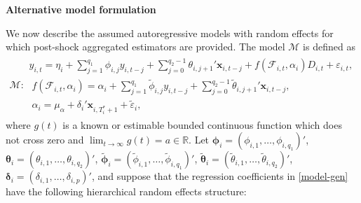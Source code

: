 \documentclass[11pt]{article}
\newcommand{\R}{\mathbb{R}}
\def\mbf#1{\mathbf{#1}} %
\def\t#1{\tilde{#1}} %
\def\mc#1{\mathcal{#1}} %
\def\mc#1{\mathcal{#1}}
\theoremstyle{definition}
\begin{document}
\vspace*{0.5cm}\noindent\textbf{Alternative model formulation} 

\vspace*{0.5cm} We now describe the assumed autoregressive models with random effects for which post-shock aggregated estimators are provided. The model $\mc{M}$ is defined as
\begin{align}
\mc{M} \colon \begin{array}{l}
  y_{i,t} =\eta_i + \sum_{j=1}^{q_1}\phi_{i,j}y_{i, t-j} + \sum_{j=0}^{q_2-1}\theta_{i,j+1}'\mbf{x}_{i,t-j} + f(\mathcal{F}_{i,t},\alpha_i)D_{i,t} + \varepsilon_{i,t},\\[.2cm]
  \; f(\mc{F}_{i,t},\alpha_i) = \alpha_i +  \sum_{j=1}^{q_{1}}\t\phi_{i,j}y_{i, t-j} + \sum_{j=0}^{q_2-1}\t\theta_{i,j+1}'\mbf{x}_{i,t-j}, \\[.2cm]
  \; \alpha_i = \mu_{\alpha} + \delta_i'\mbf{x}_{i, T_i^*+1} + \t{\varepsilon}_{i},
\end{array}\label{model-gen}
\end{align}
where $g(t)$ is a known or estimable bounded continuous function which does not cross zero and $\lim_{t\to\infty}g(t) = a \in \R$. Let 
$\mathbf{\phi}_i = (\phi_{i,1},\ldots,\phi_{i,q_1})'$, 
$\mathbf{\theta}_i = (\theta_{i,1},\ldots,\theta_{i,q_2})'$, 
$\tilde{\mathbf{\phi}}_i = (\t\phi_{i,1},\ldots,\t\phi_{i,q_{1}})'$, 
$\tilde{\mathbf{\theta}}_i = (\t\theta_{i,1},\ldots,\t\theta_{i, q_{2}})'$, 
$\mathbf{\delta}_i = (\delta_{i,1},\ldots,\delta_{i,p})'$, 
and suppose that the regression coefficients in \eqref{model-gen} have the following hierarchical random effects structure: 
\end{document}
